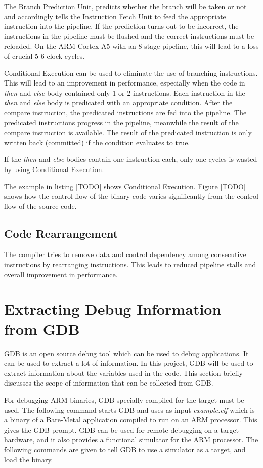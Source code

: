 The Branch Prediction Unit, predicts whether the branch will be taken or not and accordingly tells the Instruction Fetch Unit to feed the appropriate instruction into the pipeline. If the prediction turns out to be incorrect, the instructions in the pipeline must be flushed and the correct instructions must be reloaded. On the ARM Cortex A5 with an 8-stage pipeline, this will lead to a loss of crucial 5-6 clock cycles.

Conditional Execution can be used to eliminate the use of branching instructions. This will lead to an improvement in performance, especially when the code in \textit{then} and \textit{else} body contained only 1 or 2 instructions. Each instruction in the \textit{then} and \textit{else} body is predicated with an appropriate condition. After the compare instruction, the predicated instructions are fed into the pipeline. The predicated instructions progress in the pipeline, meanwhile the result of the compare instruction is available. The result of the predicated instruction is only written back (committed) if the condition evaluates to true.

If the \textit{then} and \textit{else} bodies contain one instruction each, only one cycles is wasted by using Conditional Execution.

The example in listing [TODO] shows Conditional Execution. Figure [TODO] shows how the control flow of the binary code varies significantly from the control flow of the source code.

\subsection{Code Rearrangement}
The compiler tries to remove data and control dependency among consecutive instructions by rearranging instructions. This leads to reduced pipeline stalls and overall improvement in performance.

\section{Extracting Debug Information from GDB}
GDB is an open source debug tool which can be used to debug applications. It can be used to extract a lot of information. In this project, GDB will be used to extract information about the variables used in the code. This section briefly discusses the scope of information that can be collected from GDB.

For debugging ARM binaries, GDB specially compiled for the target must be used. The following command starts GDB and uses as input \textit{example.elf} which is a binary of a Bare-Metal application compiled to run on an ARM processor. This gives the GDB prompt. GDB can be used for remote debugging on a target hardware, and it also provides a functional simulator for the ARM processor. The following commands are given to tell GDB to use a simulator as a target, and load the binary.

